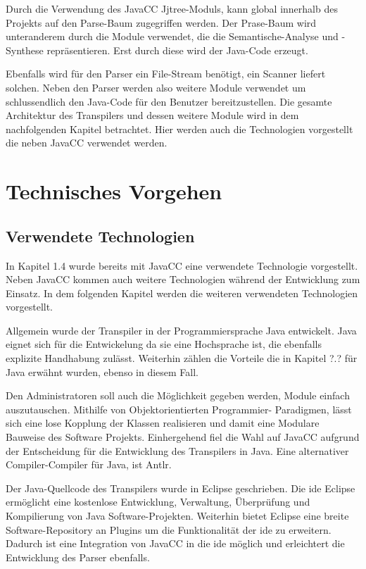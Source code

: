 Durch die Verwendung des JavaCC Jjtree-Moduls, kann global innerhalb des Projekts auf den Parse-Baum zugegriffen werden. 
Der Prase-Baum wird unteranderem durch die Module verwendet, die die Semantische-Analyse und -Synthese repräsentieren.
Erst durch diese wird der Java-Code erzeugt.

Ebenfalls wird für den Parser ein File-Stream benötigt, ein Scanner liefert solchen.
Neben den Parser werden also weitere Module verwendet um schlussendlich den Java-Code für den Benutzer bereitzustellen.
Die gesamte Architektur des Transpilers und dessen weitere Module wird in dem nachfolgenden Kapitel betrachtet. 
Hier werden auch die Technologien vorgestellt die neben JavaCC verwendet werden. 

\section{Technisches Vorgehen}
\subsection{Verwendete Technologien}
In Kapitel 1.4 wurde bereits mit JavaCC eine verwendete Technologie vorgestellt. Neben JavaCC kommen auch weitere Technologien während der Entwicklung zum Einsatz. In dem folgenden Kapitel werden die weiteren verwendeten Technologien vorgestellt.

Allgemein wurde der Transpiler in der Programmiersprache Java entwickelt. 
Java eignet sich für die Entwickelung da sie eine Hochsprache ist, die ebenfalls explizite Handhabung zulässt. 
Weiterhin zählen die Vorteile die in Kapitel ?.? für Java erwähnt wurden, ebenso in diesem Fall.

Den Administratoren soll auch die Möglichkeit gegeben werden, Module einfach auszutauschen. Mithilfe von Objektorientierten Programmier- Paradigmen, lässt sich eine lose Kopplung der Klassen realisieren und damit eine Modulare Bauweise des Software Projekts.
Einhergehend fiel die Wahl auf JavaCC aufgrund der Entscheidung für die Entwicklung des Transpilers in Java. Eine alternativer Compiler-Compiler für Java, ist Antlr. 

Der Java-Quellcode des Transpilers wurde in Eclipse geschrieben. Die \ac{ide} Eclipse ermöglicht eine kostenlose Entwicklung, Verwaltung, Überprüfung und Kompilierung von Java Software-Projekten. Weiterhin bietet Eclipse eine breite Software-Repository an Plugins um die Funktionalität der  \ac{ide} zu erweitern. Dadurch ist eine Integration von JavaCC in die  \ac{ide} möglich und erleichtert die Entwicklung des Parser ebenfalls.

